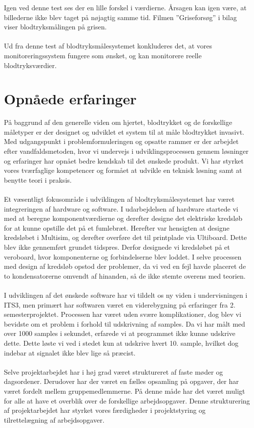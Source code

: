 Igen ved denne test ses der en lille forskel i værdierne. Årsagen kan igen være, at billederne ikke blev taget på nøjagtig samme tid. Filmen ”Griseforsøg” i bilag viser blodtryksmålingen på grisen.
\\\\ 
Ud fra denne test af blodtryksmålesystemet konkluderes det, at vores monitoreringssystem fungere som ønsket, og kan monitorere reelle blodtryksværdier. 


\section{Opnåede erfaringer}
På baggrund af den generelle viden om hjertet, blodtrykket og de forskellige måletyper er der designet og udviklet et system til at måle blodtrykket invasivt. Med udgangspunkt i problemformuleringen og opsatte rammer er der arbejdet efter vandfaldsmetoden, hvor vi undervejs i udviklingsprocessen gennem løsninger og erfaringer har opnået bedre kendskab til det ønskede produkt. Vi har styrket vores tværfaglige kompetencer og formået at udvikle en teknisk løsning samt at benytte teori i praksis.\\\\
Et væsentligt fokusområde i udviklingen af blodtryksmålesystemet har været integreringen af hardware og software. I udarbejdelsen af hardware startede vi med at beregne komponentværdierne og derefter designe det elektriske kredsløb for at kunne opstille det på et fumlebræt. Herefter var hensigten at designe kredsløbet i Multisim, og derefter overføre det til printplade via Ultiboard. Dette blev ikke gennemført grundet tidspres. Derfor designede vi kredsløbet på et veroboard, hvor komponenterne og forbindelserne blev loddet. I selve processen med design af kredsløb opstod der problemer, da vi ved en fejl havde placeret de to kondensatorerne omvendt af hinanden, så de ikke stemte overens med teorien. \\\\
I udviklingen af det ønskede software har vi tildelt os ny viden i undervisningen i ITS3, men primært har softwaren været en viderebygning på erfaringer fra 2. semesterprojektet. Processen har været uden svære komplikationer, dog blev vi bevidste om et problem i forhold til udskrivning af samples. Da vi har målt med over 1000 samples i sekundet, erfarede vi at programmet ikke kunne udskrive dette. Dette løste vi ved i stedet kun at udskrive hvert 10. sample, hvilket dog indebar at signalet ikke blev lige så præcist. \\\\ 
Selve projektarbejdet har i høj grad været struktureret af faste møder og dagsordener. Derudover har der været en fælles opsamling på opgaver, der har været fordelt mellem gruppemedlemmerne. På denne måde har det været muligt for alle at have et overblik over de forskellige arbejdsopgaver. Denne strukturering af projektarbejdet har styrket vores færdigheder i projektstyring og tilrettelægning af arbejdsopgaver.


